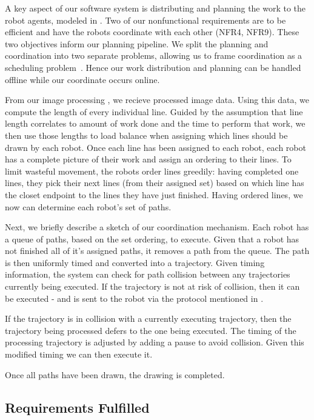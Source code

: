 A key aspect of our software system is distributing and planning the work to the robot agents, modeled in .
Two of our nonfunctional requirements are to be efficient and have the robots coordinate with each other (NFR4, NFR9). These two objectives inform our planning pipeline. We split the planning and coordination into two separate problems, allowing us to frame coordination as a scheduling problem~\cite{o1989deadlock}. Hence our work distribution and planning can be handled offline while our coordinate occurs online. 

From our image processing , we recieve processed image data. 
Using this data, we compute the length of every individual line. 
Guided by the assumption that line length correlates to amount of work done and the time to perform that work, we then use those lengths to load balance when assigning which lines should be drawn by each robot. 
Once each line has been assigned to each robot, each robot has a complete picture of their work and assign an ordering to their lines. 
To limit wasteful movement, the robots order lines greedily: having completed one lines, they pick their next lines (from their assigned set) based on which line has the closet endpoint to the lines they have just finished. 
Having ordered lines, we now can determine each robot's set of paths. 

Next, we briefly describe a sketch of our coordination mechanism. Each robot has a queue of paths, based on the set ordering, to execute.
Given that a robot has not finished all of it's assigned paths, it removes a path from the queue.
The path is then uniformly timed and converted into a trajectory.
Given timing information, the system can check for path collision between any trajectories currently being executed.
If the trajectory is not at risk of collision, then it can be executed - and is sent to the robot via the protocol mentioned in . 

If the trajectory is in collision with a currently executing trajectory, then the trajectory being processed defers to the one being executed. 
The timing of the processing trajectory is adjusted by adding a pause to avoid collision. Given this modified timing we can then execute it. 

Once all paths have been drawn, the drawing is completed.

\subsection{Requirements Fulfilled}